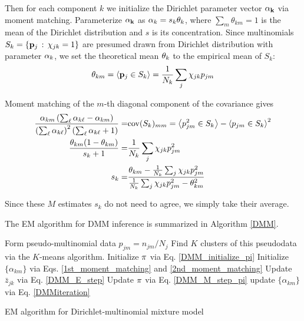 \documentclass[nofootinbib,amssymb,amsmath]{revtex4}
\begin{document}
Then for each component $k$ we initialize the Dirichlet parameter vector ${\bf \alpha_k}$ via moment matching.  Parameterize ${\bf \alpha_k}$ as ${\bf \alpha}_k = s_k {\bf \theta}_k$, where $\sum_m \theta_{km} = 1$ is the mean of the Dirichlet distribution and $s$ is its concentration.  Since multinomials $S_k = \{ {\bf p}_j \, : \, \chi_{jk} = 1 \}$ are presumed drawn from Dirichlet distribution with parameter ${\bf \alpha}_k$, we set the theoretical mean ${\bf \theta}_k$ to the empirical mean of $S_k$:
\begin{equation}
\theta_{km} = \left\langle   {\bf p}_j \in S_k \right\rangle = \frac{1}{N_k} \sum_j \chi_{jk} p_{jm}
\label{1st_moment_matching}
\end{equation}

Moment matching of the $m$-th diagonal component of the covariance gives
\begin{align}
\frac{ \alpha_{km} \left( \sum_\ell \alpha_{k \ell} - \alpha_{km} \right) }{\left( \sum_\ell \alpha_{k \ell}\right)^2 \left( \sum_\ell \alpha_{k \ell} + 1 \right) }=& {\rm cov}(S_k)_{mm} =  \left\langle   p_{jm}^2 \in S_k \right\rangle - \left\langle   p_{jm} \in S_k \right\rangle^2 \\
%
\frac{ \theta_{km} (1 - \theta_{km})} {s_k + 1} =& \frac{1}{N_k} \sum_j \chi_{jk} p^2_{jm} \\
s_k = & \frac{  \theta_{km} - \frac{1}{N_k} \sum_j \chi_{jk} p^2_{jm}}{\frac{1}{N_k} \sum_j \chi_{jk} p^2_{jm} - \theta_{km}^2 }
\label{2nd_moment_matching}
\end{align}

Since these $M$ estimates $s_k$ do not need to agree, we simply take their average.


The EM algorithm for DMM inference is summarized in Algorithm \ref{DMM}.

\begin{algorithm}
\begin{algorithmic}[1]
\State Form pseudo-multinomial data $p_{jm} = n_{jm} / N_j$
\State Find $K$ clusters of this pseudodata via the $K$-means algorithm.
\State Initialize ${\bf \pi}$ via Eq. \ref{DMM_initialize_pi}
\State Initialize $\{ \alpha_{km} \}$ via Eqs. \ref{1st_moment_matching} and \ref{2nd_moment_matching}
\Repeat
	\State Update $\bar{z}_{jk}$ via Eq. \ref{DMM_E_step}
	\State Update ${ \bf \pi}$ via Eq. \ref{DMM_M_step_pi}
		\Repeat
		\State update $ \{ \alpha_{km} \}$ via Eq. \ref{DMMiteration}
\end{algorithmic}
\caption{EM algorithm for Dirichlet-multinomial mixture model}
\label{DMM}
\end{algorithm}
\end{document}
